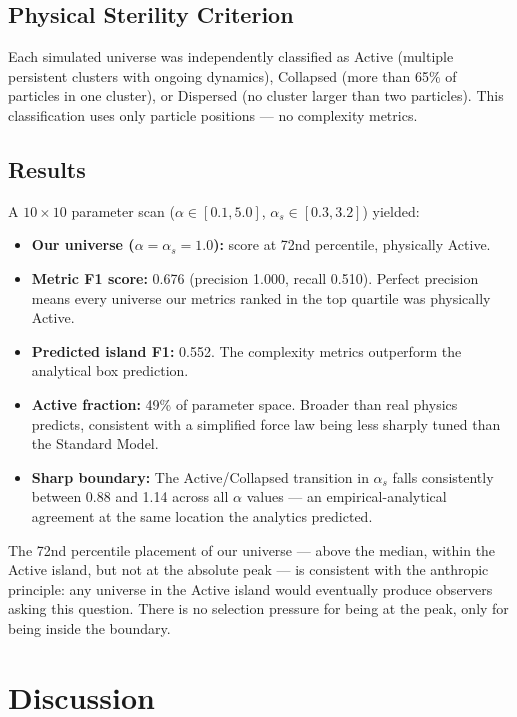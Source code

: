 \documentclass[12pt,a4paper]{article}
\begin{document}
\subsection{Physical Sterility Criterion}

Each simulated universe was independently classified as Active
(multiple persistent clusters with ongoing dynamics), Collapsed
(more than 65\% of particles in one cluster), or Dispersed
(no cluster larger than two particles).
This classification uses only particle positions — no complexity metrics.

\subsection{Results}

A $10 \times 10$ parameter scan ($\alpha \in [0.1, 5.0]$,
$\alpha_s \in [0.3, 3.2]$) yielded:

\begin{itemize}[noitemsep]
  \item \textbf{Our universe ($\alpha = \alpha_s = 1.0$):}
    score at 72nd percentile, physically Active.
  \item \textbf{Metric F1 score:} 0.676 (precision 1.000, recall 0.510).
    Perfect precision means every universe our metrics ranked in the
    top quartile was physically Active.
  \item \textbf{Predicted island F1:} 0.552.
    The complexity metrics outperform the analytical box prediction.
  \item \textbf{Active fraction:} 49\% of parameter space.
    Broader than real physics predicts, consistent with a simplified
    force law being less sharply tuned than the Standard Model.
  \item \textbf{Sharp boundary:} The Active/Collapsed transition in
    $\alpha_s$ falls consistently between 0.88 and 1.14 across all $\alpha$
    values — an empirical-analytical agreement at the same location
    the analytics predicted.
\end{itemize}

The 72nd percentile placement of our universe — above the median,
within the Active island, but not at the absolute peak — is consistent
with the anthropic principle: any universe in the Active island would
eventually produce observers asking this question.
There is no selection pressure for being at the peak, only for being
inside the boundary.

\section{Discussion}
\end{document}
